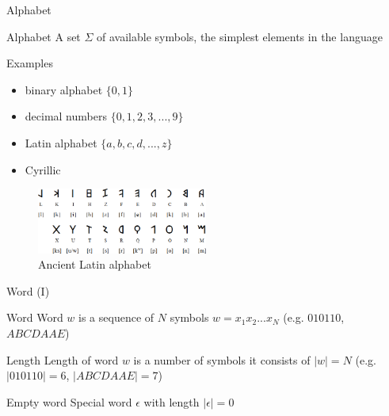 \documentclass{beamer}
\begin{document}
\begin{frame}{Alphabet}

\begin{block}{Alphabet}
A set $\Sigma$ of available symbols, the simplest elements in the language
\end{block}

\begin{exampleblock}{Examples}
\begin{itemize}
\item binary alphabet $\{0, 1\}$
\item decimal numbers $\{0,1,2,3,...,9\}$
\item Latin alphabet $\{a,b,c,d,...,z\}$
\item Cyrillic
\end{itemize}
\end{exampleblock}

\begin{figure}
\includegraphics[width=0.5\textwidth]{img/latin_archaic.png}
\caption{\label{fig:latin_archaic}Ancient Latin alphabet}
\end{figure}

\end{frame}

\begin{frame}{Word (I)}
\begin{block}{Word}
Word $w$ is a sequence of $N$ symbols $w = x_1x_2...x_N$ (e.g. $010110$, $ABCDAAE$)
\end{block}

\begin{block}{Length}
Length of word $w$ is a number of symbols it consists of $|w|=N$ (e.g. $|010110| = 6$, $|ABCDAAE| = 7$)
\end{block}

\begin{alertblock}{Empty word}
Special word $\epsilon$ with length $|\epsilon|=0$
\end{alertblock}

\end{frame}
\end{document}
